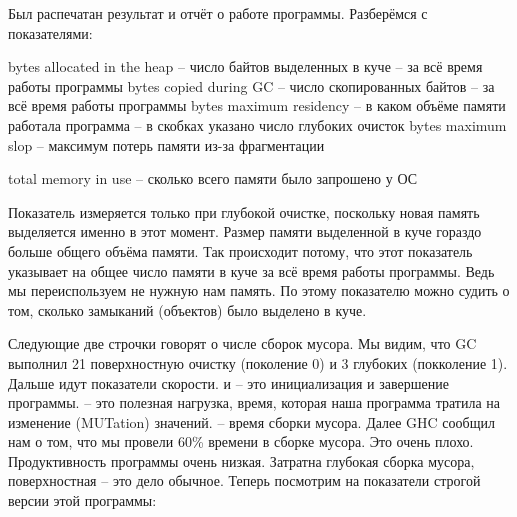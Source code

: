 
Был распечатан результат и отчёт о работе программы. Разберёмся
с показателями:

\begin{code}
bytes allocated in the heap  -- число байтов выделенных в куче
                             -- за всё время работы программы
bytes copied during GC       -- число скопированных байтов
                             -- за всё время работы программы
bytes maximum residency      -- в каком объёме памяти работала программа 
                             -- в скобках указано число глубоких очисток
bytes maximum slop           -- максимум потерь памяти из-за фрагментации

total memory in use          -- сколько всего памяти было запрошено у ОС
\end{code}

Показатель  измеряется только
при глубокой очистке, поскольку новая память выделяется именно
в этот момент. Размер памяти выделенной в куче гораздо больше
общего объёма памяти. Так происходит потому, что этот показатель
указывает на общее число памяти в куче за всё время работы программы.
Ведь мы переиспользуем не нужную нам память. По этому
показателю можно судить о том, сколько замыканий (объектов) 
было выделено в куче. 

Следующие две строчки говорят о числе сборок мусора. Мы видим,
что GC выполнил 21 поверхностную очистку (поколение 0) и 
3 глубоких (покколение 1). 
Дальше идут показатели скорости.  и  -- это 
инициализация и завершение программы.  -- это полезная
нагрузка, время, которая наша программа тратила на изменение (MUTation)
значений.  -- время сборки мусора. Далее GHC сообщил
нам о том, что мы провели 60\% времени в сборке мусора.
Это очень плохо. Продуктивность программы очень низкая. 
Затратна глубокая сборка мусора, поверхностная -- это дело обычное.
Теперь посмотрим на показатели строгой версии этой программы:

